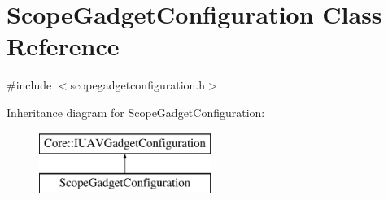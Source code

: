 \hypertarget{class_scope_gadget_configuration}{\section{\-Scope\-Gadget\-Configuration \-Class \-Reference}
\label{class_scope_gadget_configuration}
}


{\ttfamily \#include $<$scopegadgetconfiguration.\-h$>$}

\-Inheritance diagram for \-Scope\-Gadget\-Configuration\-:\begin{figure}[H]
\begin{center}
\leavevmode
\includegraphics[height=2.000000cm]{class_scope_gadget_configuration}
\end{center}
\end{figure}
